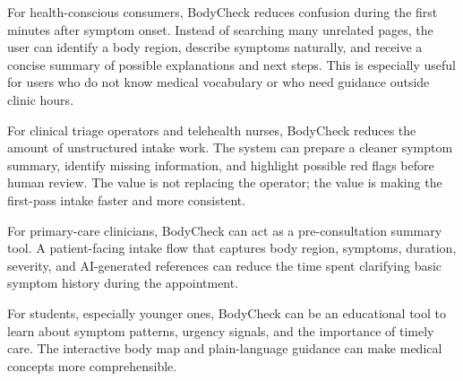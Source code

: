 For health-conscious consumers, BodyCheck reduces confusion during the first
minutes after symptom onset. Instead of searching many unrelated pages, the user
can identify a body region, describe symptoms naturally, and receive a concise
summary of possible explanations and next steps. This is especially useful for
users who do not know medical vocabulary or who need guidance outside clinic
hours.

For clinical triage operators and telehealth nurses, BodyCheck reduces the
amount of unstructured intake work. The system can prepare a cleaner symptom
summary, identify missing information, and highlight possible red flags before
human review. The value is not replacing the operator; the value is making the
first-pass intake faster and more consistent.

For primary-care clinicians, BodyCheck can act as a pre-consultation summary
tool. A patient-facing intake flow that captures body region, symptoms,
duration, severity, and AI-generated references can reduce the time spent
clarifying basic symptom history during the appointment.

For students, especially younger ones, BodyCheck can be an educational tool to learn about symptom patterns, urgency signals, and the importance of timely care. The interactive body map and plain-language guidance can make medical concepts more comprehensible.

